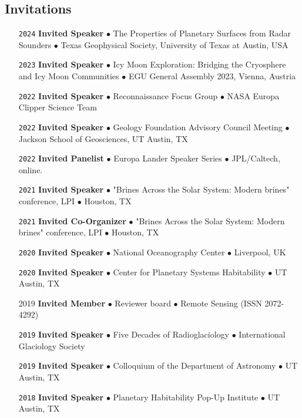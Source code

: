 \vspace{-1.5em}
\subsection*{Invitations}

\begin{itemize}[leftmargin=3.8em, labelsep=1.5em]
    \setlength\itemsep{-.5em}
    \item[\texttt{2024}] \textbf{Invited Speaker} $\bullet$ The Properties of Planetary Surfaces from Radar Sounders $\bullet$ Texas Geophysical Society, University of Texas at Austin, USA
    \item[\texttt{2023}] \textbf{Invited Speaker} $\bullet$ Icy Moon Exploration: Bridging the Cryosphere and Icy Moon Communities $\bullet$  EGU General Assembly 2023, Vienna, Austria
    \item[\texttt{2022}] \textbf{Invited Speaker} $\bullet$ Reconnaissance Focus Group $\bullet$ NASA Europa Clipper Science Team
    \item[\texttt{2022}] \textbf{Invited Speaker} $\bullet$ Geology Foundation Advisory Council Meeting $\bullet$ Jackson School of Geosciences, UT Austin, TX
    \item[\texttt{2022}] \textbf{Invited Panelist} $\bullet$ Europa Lander Speaker Series $\bullet$ JPL/Caltech, online.
    \item[\texttt{2021}] \textbf{Invited Speaker} $\bullet$ "Brines Across the Solar System: Modern brines" conference, LPI $\bullet$ Houston, TX
    \item[\texttt{2021}] \textbf{Invited Co-Organizer} $\bullet$ "Brines Across the Solar System: Modern brines" conference, LPI $\bullet$ Houston, TX
    \item[\texttt{2020}] \textbf{Invited Speaker} $\bullet$ National Oceanography Center $\bullet$ Liverpool, UK
    \item[\texttt{2020}] \textbf{Invited Speaker} $\bullet$ Center for Planetary Systems Habitability $\bullet$ UT Austin, TX
    \item[2019] \textbf{Invited Member} $\bullet$ Reviewer board $\bullet$ Remote Sensing (ISSN 2072-4292)
    \item[\texttt{2019}] \textbf{Invited Speaker} $\bullet$ Five Decades of Radioglaciology $\bullet$ International Glaciology Society
    \item[\texttt{2019}] \textbf{Invited Speaker} $\bullet$ Colloquium of the Department of Astronomy $\bullet$ UT Austin, TX
    \item[\texttt{2018}] \textbf{Invited Speaker} $\bullet$ Planetary Habitability Pop-Up Institute $\bullet$ UT Austin, TX

\end{itemize}
